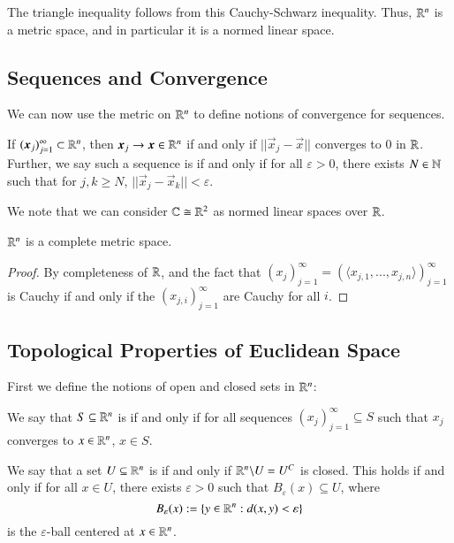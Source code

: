 The triangle inequality follows from this Cauchy-Schwarz inequality. Thus, $\mathbb R^n$ is a metric space, and in particular it is a normed linear space.

\subsection{Sequences and Convergence}

We can now use the metric on $\mathbb R^n$ to define notions of convergence for sequences.

\begin{defn}
    If $(\vec{x}_j)_{j=1}^{\infty} \subset \R^n$, then $\vec{x}_j\rightarrow \vec{x} \in \R^n$ if and only if $||\vec{x}_j-\vec{x}||$ converges to $0$ in $\mathbb R$. Further, we say such a sequence is  if and only if for all $\varepsilon > 0$, there exists $N \in \mathbb N$ such that for $j,k \geq N$, $||\vec{x}_j - \vec{x}_k|| < \varepsilon$.
\end{defn}

We note that we can consider $\mathbb C \cong \mathbb R^2$ as normed linear spaces over $\mathbb R$.

\begin{prop}
    $\mathbb R^n$ is a complete metric space.
\end{prop}
\begin{proof}
    By completeness of $\mathbb R$, and the fact that $(x_j)_{j=1}^{\infty} = (\langle x_{j,1},...,x_{j,n}\rangle)_{j=1}^{\infty}$ is Cauchy if and only if the $(x_{j,i})_{j=1}^{\infty}$ are Cauchy for all $i$.
\end{proof}

\subsection{Topological Properties of Euclidean Space}

First we define the notions of open and closed sets in $\mathbb R^n$: 

\begin{defn}
    We say that $S \subseteq \mathbb R^n$ is  if and only if for all sequences $(x_j)_{j=1}^{\infty} \subseteq S$ such that $x_j$ converges to $x \in \mathbb R^n$, $x \in S$.
\end{defn}

\begin{defn}
    We say that a set $U \subseteq \mathbb R^n$ is  if and only if $\mathbb R^n\backslash U = U^C$ is closed. This holds if and only if for all $x \in U$, there exists $\varepsilon > 0$ such that $B_{\varepsilon}(x) \subseteq U$, where \begin{equation*}
        B_{\varepsilon}(x) := \{y \in \mathbb R^n:d(x,y) < \varepsilon\}
    \end{equation*}
    is the $\varepsilon$-ball centered at $x \in \mathbb R^n$.
\end{defn}

